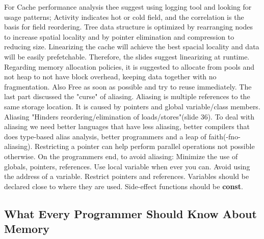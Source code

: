\documentclass[a4paper]{article}
\begin{document}
For Cache performance analysis thee suggest using logging tool and looking for usage patterns;
 Activity indicates hot or cold field,
 and the correlation is the basis for field reordering.
Tree data structure is optimized by rearranging nodes to increase spatial locality and by pointer elimination and compression to reducing size. Linearizing the cache will achieve the best spacial locality and data will be easily prefetchable. Therefore, the slides suggest linearizing at runtime. Regarding memory allocation policies, it is suggested to allocate from pools and not heap to not have block overhead, keeping data together with no fragmentation. Also Free as soon as possible and try to reuse immediately. 
\newline
The last part discussed the "curse" of aliasing. Aliasing is multiple references to the same storage location. It is caused by pointers and global variable/class members. Aliasing "Hinders reordering/elimination of loads/stores"(slide 36). To deal with aliasing we need better languages that have less aliasing, better compilers that does type-based alias analysis, better programmers and a leap of faith(-fno-aliasing). Restricting a pointer can help perform parallel operations not possible otherwise. 
On the programmers end, to avoid aliasing:
Minimize the use of globals, pointers, references. Use local variable when ever you can. Avoid using the address of a variable. Restrict pointers and references. Variables should be declared close to where they are used. Side-effect functions should be \textbf{const}.     

\subsection{What Every Programmer Should Know About Memory}
\end{document}

